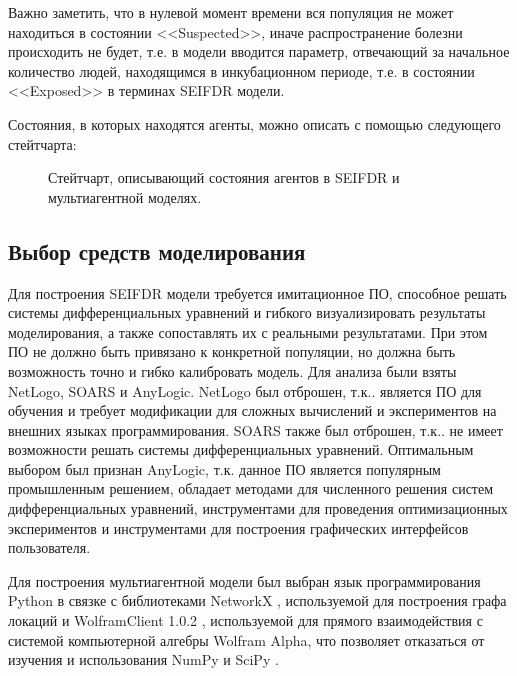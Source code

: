 Важно заметить, что в нулевой момент времени вся популяция не  может находиться в состоянии <<Suspected>>, иначе распространение болезни происходить не будет,  т.е. в модели вводится параметр, отвечающий за начальное количество людей, находящимся в инкубационном периоде,  т.е. в состоянии <<Exposed>>  в терминах SEIFDR модели.   

Состояния, в которых находятся агенты, можно описать с помощью следующего стейтчарта:
\begin{figure}
	\caption{Стейтчарт, описывающий состояния агентов в SEIFDR и мультиагентной моделях.}
\end{figure}
\subsection{Выбор средств моделирования}

Для построения SEIFDR модели требуется имитационное ПО, способное решать системы дифференциальных уравнений и гибкого визуализировать результаты моделирования, а также сопоставлять их с реальными результатами. При этом ПО не должно быть привязано к конкретной популяции, но должна быть возможность точно и гибко калибровать модель. Для анализа были взяты NetLogo, SOARS  и AnyLogic. NetLogo был отброшен,   т.к.. является ПО для обучения и  требует модификации для сложных вычислений и экспериментов на внешних языках программирования. SOARS также был отброшен,   т.к.. не имеет возможности решать системы дифференциальных уравнений. Оптимальным выбором был признан AnyLogic,  т.к. данное ПО является популярным промышленным решением, обладает методами для численного решения систем дифференциальных уравнений, инструментами для проведения оптимизационных экспериментов и инструментами для построения графических интерфейсов пользователя.


Для построения мультиагентной модели был выбран язык программирования Python в связке с библиотеками NetworkX %
\cite{NetworkX:git} , используемой для построения графа локаций 
и WolframClient 1.0.2 %
\cite{PiP:Wolfram}, используемой для прямого взаимодействия с системой компьютерной алгебры Wolfram Alpha, что позволяет отказаться от изучения и использования NumPy и SciPy %
.

